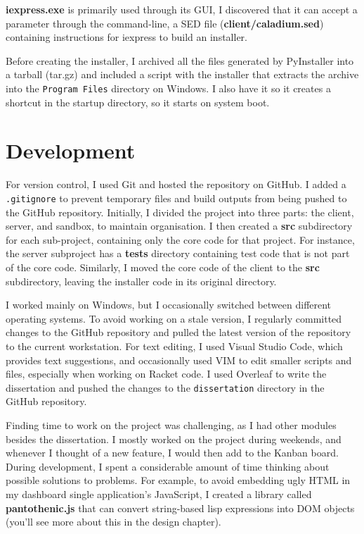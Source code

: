 \textbf{iexpress.exe} is primarily used through its GUI,
I discovered that it can accept a parameter through the command-line,
a SED file (\textbf{client/caladium.sed})
containing instructions for iexpress to build an installer.

Before creating the installer,
I archived all the files generated by PyInstaller into a tarball (tar.gz)
and included a script with the installer that
extracts the archive into the \texttt{Program Files} directory on Windows.
I also have it so it creates a shortcut in the startup directory,
so it starts on system boot.

\section{Development}
For version control, I used Git and hosted the repository on GitHub.
I added a \texttt{.gitignore} to prevent temporary files
and build outputs from being pushed to the GitHub repository.
Initially, I divided the project into
three parts: the client, server, and sandbox,
to maintain organisation. I then created a \textbf{src} subdirectory
for each sub-project, containing only the core code for that project.
For instance, the server subproject has a \textbf{tests} directory
containing test code that is not part of the core code.
Similarly, I moved the core code of the client to the
\textbf{src} subdirectory, leaving
the installer code in its original directory.

I worked mainly on Windows, but I occasionally switched
between different operating systems. To avoid working on
a stale version, I regularly committed changes to the
GitHub repository and pulled the latest version of the
repository to the current workstation. For text editing,
I used Visual Studio Code, which provides text suggestions,
and occasionally used VIM to edit smaller scripts and files,
especially when working on Racket code.
I used Overleaf to write the dissertation and pushed the changes to the
\texttt{dissertation} directory in the GitHub repository.

Finding time to work on the project was challenging,
as I had other modules besides the dissertation.
I mostly worked on the project during weekends, and whenever
I thought of a new feature, I would then add to the Kanban board.
During development, I spent a considerable amount of time thinking
about possible solutions to problems. For example,
to avoid embedding ugly HTML in my dashboard single application's JavaScript,
I created a library called \textbf{pantothenic.js} that can convert 
string-based lisp expressions into DOM objects
(you'll see more about this in the design chapter).

